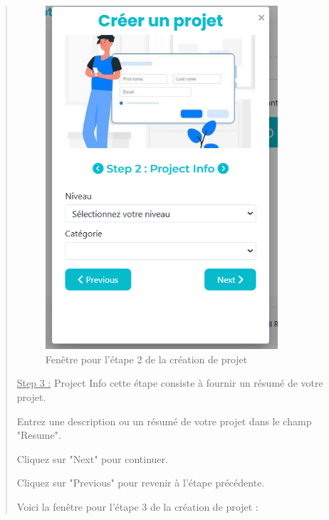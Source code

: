 \documentclass[a4paper,12pt]{article}
\begin{document}
\begin{quote}
\begin{figure}[H]
\centering
\includegraphics[width=0.85\textwidth]{IMAGES/etape2-projet.png}
\caption{Fenêtre pour l'étape 2 de la création de projet}
\label{fig:etape2projet}
\end{figure}

\underline{Step 3 :} Project Info cette étape consiste à fournir un résumé de votre projet.

Entrez une description ou un résumé de votre projet dans le champ "Resume".

Cliquez sur "Next" pour continuer.

Cliquez sur "Previous" pour revenir à l'étape précédente.

Voici la fenêtre pour l'étape 3 de la création de projet :


\end{quote}
\end{document}
